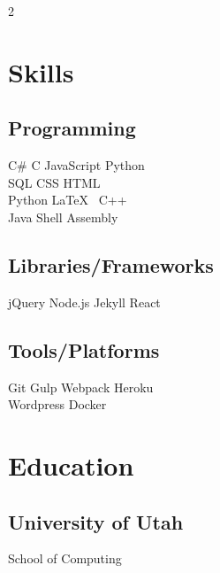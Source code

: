 \documentclass[]{plushcv}
\begin{document}
\begin{paracol}{2}
\switchcolumn[1]



\section{Skills}
\subsection{Programming}
\sectionsep
{}
C\# \textbullet{} C \textbullet{} JavaScript \textbullet{} Python    \\ SQL \textbullet{} CSS \textbullet{} HTML \textbullet{} \\
\sectionsep
{}
Python \textbullet{} \LaTeX\ \textbullet{}  C++  \\
\sectionsep
{}
Java \textbullet{}  Shell \textbullet{} Assembly \\
\sectionsep
\sectionsep
\subsection{Libraries/Frameworks}
\sectionsep
jQuery \textbullet{} Node.js \textbullet{} Jekyll \textbullet{} React \\
\sectionsep
\sectionsep
\subsection{Tools/Platforms}
\sectionsep
Git \textbullet{} Gulp \textbullet{} Webpack \textbullet{} Heroku    \\ Wordpress \textbullet{} Docker \\

\sectionsep


\section{Education} 
\subsection{University of Utah}
School of Computing \\


\end{paracol}
\end{document}
